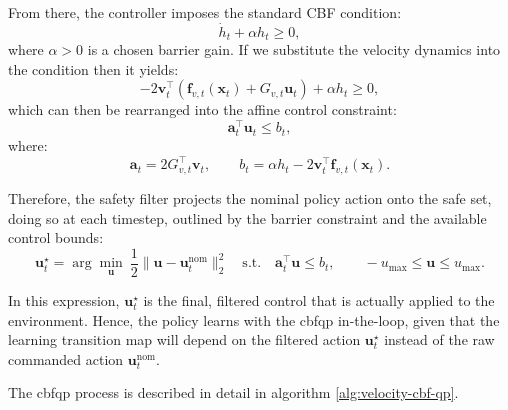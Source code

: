 From there, the controller imposes the standard CBF condition:
\[
\dot{h}_t + \alpha h_t \ge 0,
\]
where $\alpha>0$ is a chosen barrier gain. If we substitute the velocity dynamics into the condition then it yields:
\[
-2\mathbf{v}_t^\top\left(\mathbf{f}_{v,t}(\mathbf{x}_t)+G_{v,t}\mathbf{u}_t\right)
+ \alpha h_t \ge 0,
\]
which can then be rearranged into the affine control constraint:
\[
\mathbf{a}_t^\top \mathbf{u}_t \le b_t,
\]
where:
\[
\mathbf{a}_t = 2G_{v,t}^\top\mathbf{v}_t,
\qquad
b_t = \alpha h_t - 2\mathbf{v}_t^\top \mathbf{f}_{v,t}(\mathbf{x}_t).
\]

Therefore, the safety filter projects the nominal policy action onto the safe set, doing so at each timestep, outlined by the barrier constraint and the available control bounds:
\[
\mathbf{u}_t^\star =
\arg\min_{\mathbf{u}}\ \frac12\|\mathbf{u}-\mathbf{u}_t^{\mathrm{nom}}\|_2^2
\quad \text{s.t.} \quad
\mathbf{a}_t^\top \mathbf{u} \le b_t,\qquad
-u_{\max}\le \mathbf{u}\le u_{\max}.
\]

In this expression, $\mathbf{u}_t^\star$ is the final, filtered control that is actually applied to the environment. Hence, the policy learns with the \acs{cbfqp} in-the-loop, given that the learning transition map will depend on the filtered action $\mathbf{u}_t^\star$ instead of the raw commanded action $\mathbf{u}_t^{\mathrm{nom}}$.

The \acs{cbfqp} process is described in detail in algorithm \ref{alg:velocity-cbf-qp}.

